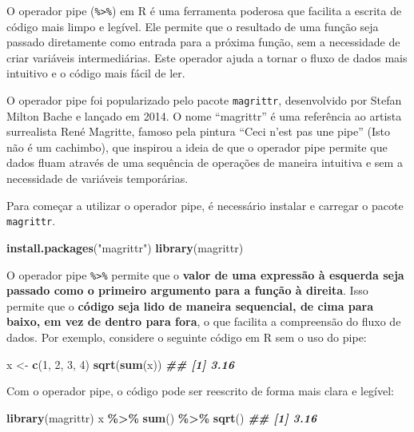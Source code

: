 \documentclass[
]{book}
\newenvironment{Shaded}{\begin{snugshade}}{\end{snugshade}}
\newcommand{\DecValTok}[1]{\textcolor[rgb]{0.00,0.00,0.81}{#1}}
\newcommand{\DocumentationTok}[1]{\textcolor[rgb]{0.56,0.35,0.01}{\textbf{\textit{#1}}}}
\newcommand{\FunctionTok}[1]{\textcolor[rgb]{0.13,0.29,0.53}{\textbf{#1}}}
\newcommand{\NormalTok}[1]{#1}
\newcommand{\OtherTok}[1]{\textcolor[rgb]{0.56,0.35,0.01}{#1}}
\newcommand{\SpecialCharTok}[1]{\textcolor[rgb]{0.81,0.36,0.00}{\textbf{#1}}}
\newcommand{\StringTok}[1]{\textcolor[rgb]{0.31,0.60,0.02}{#1}}
\begin{document}
O operador pipe (\texttt{\%\textgreater{}\%}) em R é uma ferramenta poderosa que facilita a
escrita de código mais limpo e legível. Ele permite que o resultado de
uma função seja passado diretamente como entrada para a próxima função,
sem a necessidade de criar variáveis intermediárias. Este operador ajuda
a tornar o fluxo de dados mais intuitivo e o código mais fácil de ler.

O operador pipe foi popularizado pelo pacote \texttt{magrittr}, desenvolvido
por Stefan Milton Bache e lançado em 2014. O nome ``magrittr'' é uma
referência ao artista surrealista René Magritte, famoso pela pintura
``Ceci n'est pas une pipe'' (Isto não é um cachimbo), que inspirou a ideia
de que o operador pipe permite que dados fluam através de uma sequência
de operações de maneira intuitiva e sem a necessidade de variáveis
temporárias.

Para começar a utilizar o operador pipe, é necessário instalar e
carregar o pacote \texttt{magrittr}.

\begin{Shaded}
\begin{Highlighting}[]
\FunctionTok{install.packages}\NormalTok{(}\StringTok{"magrittr"}\NormalTok{)}
\FunctionTok{library}\NormalTok{(magrittr)}
\end{Highlighting}
\end{Shaded}

O operador pipe \texttt{\%\textgreater{}\%} permite que o \textbf{valor de uma expressão à esquerda seja passado como o primeiro argumento para a função à direita}. Isso permite que o \textbf{código seja lido de maneira sequencial, de cima para baixo, em vez de dentro para fora}, o que facilita a compreensão do fluxo de dados. Por exemplo, considere o seguinte código em R sem o uso do pipe:

\begin{Shaded}
\begin{Highlighting}[]
\NormalTok{x }\OtherTok{\textless{}{-}} \FunctionTok{c}\NormalTok{(}\DecValTok{1}\NormalTok{, }\DecValTok{2}\NormalTok{, }\DecValTok{3}\NormalTok{, }\DecValTok{4}\NormalTok{)}
\FunctionTok{sqrt}\NormalTok{(}\FunctionTok{sum}\NormalTok{(x))}
\DocumentationTok{\#\# [1] 3.16}
\end{Highlighting}
\end{Shaded}

Com o operador pipe, o código pode ser reescrito de forma mais clara e
legível:

\begin{Shaded}
\begin{Highlighting}[]
\FunctionTok{library}\NormalTok{(magrittr)}
\NormalTok{x }\SpecialCharTok{\%\textgreater{}\%} \FunctionTok{sum}\NormalTok{() }\SpecialCharTok{\%\textgreater{}\%} \FunctionTok{sqrt}\NormalTok{()}
\DocumentationTok{\#\# [1] 3.16}
\end{Highlighting}
\end{Shaded}
\end{document}
